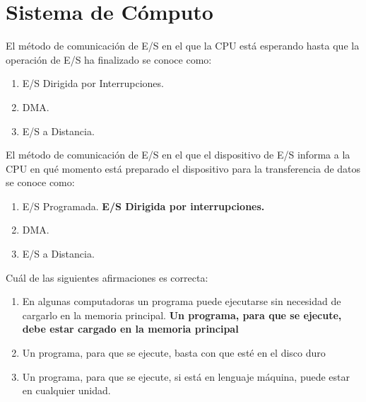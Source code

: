 \section{Sistema de Cómputo}


\begin{ejercicio}\label{ej:1.Ejercicio1}
    El método de comunicación de E/S en el que la CPU está esperando hasta que la operación de E/S ha
    finalizado se conoce como:
    
    \begin{enumerate}[label=(\alph*)]
      \myitem \textbf{E/S Programada.}
      \item E/S Dirigida por Interrupciones.
      \item DMA.
      \item E/S a Distancia.
    \end{enumerate}
    
\end{ejercicio}

\begin{ejercicio}\label{ej:1.Ejercicio2}
    El método de comunicación de E/S en el que el dispositivo de E/S informa a la CPU en qué momento está 
    preparado el dispositivo para la transferencia de datos se conoce como:
    
    \begin{enumerate}[label=(\alph*)]
      
      \item E/S Programada.
      \myitem \textbf{E/S Dirigida por interrupciones.}
      \item DMA.
      \item E/S a Distancia.
    \end{enumerate}
    
\end{ejercicio}

\begin{ejercicio}\label{ej:1.Ejercicio3}
    Cuál de las siguientes afirmaciones es correcta:
    
    \begin{enumerate}[label=(\alph*)]
      
      \item En algunas computadoras un programa puede ejecutarse sin necesidad de cargarlo en la memoria principal.
      \myitem \textbf{Un programa, para que se ejecute, debe estar cargado en la memoria principal}
      \item Un programa, para que se ejecute, basta con que esté en el disco duro
      \item Un programa, para que se ejecute, si está en lenguaje máquina, puede estar en cualquier unidad.
    \end{enumerate}
    
\end{ejercicio}

